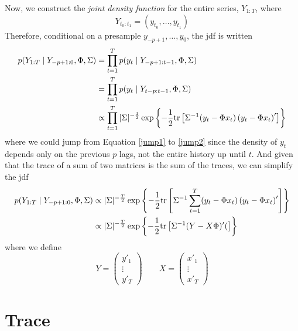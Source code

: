 \documentclass[a4paper,12pt]{scrartcl}
\begin{document}
Now, we construct the \emph{joint density function} for
the entire series, $Y_{1:T}$, where 
    \[ Y_{t_0:t_1} = (y_{t_0}, \ldots, y_{t_1}) \]
Therefore, conditional on a presample $y_{-p+1}, \ldots, y_0$, 
the jdf is written
\begin{align}
    p(Y_{1:T} \; | \; Y_{-p+1:0}, \Phi, \Sigma)
	&= \prod_{t=1}^T p(y_t \; | \; Y_{-p+1:t-1}, \Phi, \Sigma) 
	\label{jump1} \\
    &= \prod_{t=1}^T p(y_t \; | \; Y_{t-p:t-1}, \Phi, \Sigma) 
	\label{jump2} \\
    &\propto \prod_{t=1}^T
	|\Sigma|^{-\frac{1}{2}} 
	\exp\left\{ -\frac{1}{2} \text{tr} \left[ \Sigma^{-1}  
	(y_t - \Phi x_t)\left(y_t - \Phi x_t\right)'
	\right]\right\} \notag
\end{align}
where we could jump from Equation \ref{jump1} to \ref{jump2}
since the density of $y_t$ depends only on the previous
$p$ lags, not the entire history up until $t$. 
And given that the trace of a sum of two matrices is the
sum of the traces, we can simplify the jdf
\begin{align}
    p(Y_{1:T} \; | \; Y_{-p+1:0}, \Phi, \Sigma)
	&\propto 
	|\Sigma|^{-\frac{T}{2}} 
	\exp\left\{ -\frac{1}{2} \text{tr} \left[ \Sigma^{-1}  
	\sum^T_{t=1} (y_t - \Phi x_t)\left(y_t - \Phi x_t\right)'
	\right]\right\} \notag \\
    &\propto 
	|\Sigma|^{-\frac{T}{2}} 
	\exp\left\{ -\frac{1}{2} \text{tr} \left[ \Sigma^{-1}  
	(Y - X\Phi)'(
	\right]\right\} \notag
\end{align}
where we define
    \[ Y = \begin{pmatrix} y'_1 \\ \vdots \\ y'_T \end{pmatrix} \qquad
     X = \begin{pmatrix} x'_1 \\ \vdots \\ x'_T \end{pmatrix} \]







\newpage
\appendix
\section{Trace}
\end{document}
